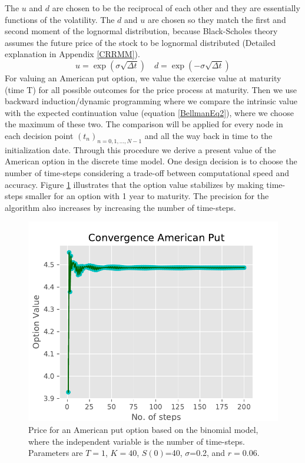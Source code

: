 The $u$ and $d$ are chosen to be the reciprocal of each other and they are essentially functions of the volatility. The $d$ and $u$ are chosen so they match the first and second moment of the lognormal distribution, because Black-Scholes theory assumes the future price of the stock to be lognormal distributed (Detailed explanation in Appendix \ref{CRRMM}).
$$u= \exp(\sigma \sqrt{\Delta t}) \quad d= \exp(-\sigma \sqrt{\Delta t})$$
For valuing an American put option, we value the exercise value at maturity (time T) for all possible outcomes for the price process at maturity. Then we use backward induction/dynamic programming where we compare the intrinsic value with the expected continuation value (equation \eqref{BellmanEq2}), where we choose the maximum of these two. The comparison will be applied for every node in each decision point $(t_{n})_{n=0,1,\ldots,N-1}$ and all the way back in time to the initialization date. Through this procedure we derive a present value of the American option in the discrete time model. One design decision is to choose the number of time-steps considering a trade-off between computational speed and accuracy. Figure \ref{fig:binConv} illustrates that the option value stabilizes by making time-steps smaller for an option with 1 year to maturity. The precision for the algorithm also increases by increasing the number of time-steps.\\

\begin{figure}[th]
\centering
\includegraphics{Figures/binConv.pdf}
\decoRule
\caption[Convergence of Binomial Model]{Price for an American put option based on the binomial model, where the independent variable is the number of time-steps. Parameters are $T=1$, $K=40$, $S(0)$=40, $\sigma$=0.2, and $r=0.06$.}
\label{fig:binConv}
\end{figure}

